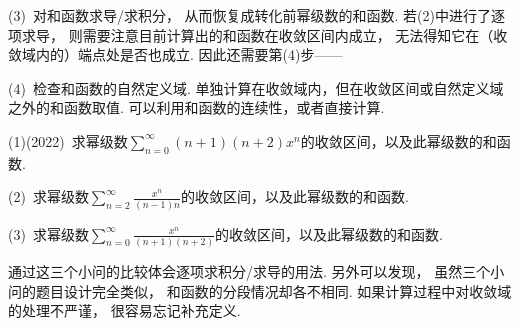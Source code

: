 (3)~对和函数求导/求积分，
从而恢复成转化前幂级数的和函数.
若(2)中进行了逐项求导，
则需要注意目前计算出的和函数在收敛区间内成立，
无法得知它在（收敛域内的）端点处是否也成立.
因此还需要第(4)步——

(4)~检查和函数的自然定义域.
单独计算在收敛域内，但在收敛区间或自然定义域之外的和函数取值.
可以利用和函数的连续性，或者直接计算.

\begin{example}
\label{ex:ch10-26}
(1)(2022)~求幂级数$\sum_{n=0}^{\infty} (n+1)(n+2)x^n$的收敛区间，以及此幂级数的和函数.

(2)~求幂级数$\sum_{n=2}^{\infty} \frac{x^n}{(n-1)n}$的收敛区间，以及此幂级数的和函数.

(3)~求幂级数$\sum_{n=0}^{\infty} \frac{x^n}{(n+1)(n+2)}$的收敛区间，以及此幂级数的和函数.
\end{example}

\begin{analysis}
通过这三个小问的比较体会逐项求积分/求导的用法.
    另外可以发现，
    虽然三个小问的题目设计完全类似，
    和函数的分段情况却各不相同.
    如果计算过程中对收敛域的处理不严谨，
    很容易忘记补充定义.
\end{analysis}

